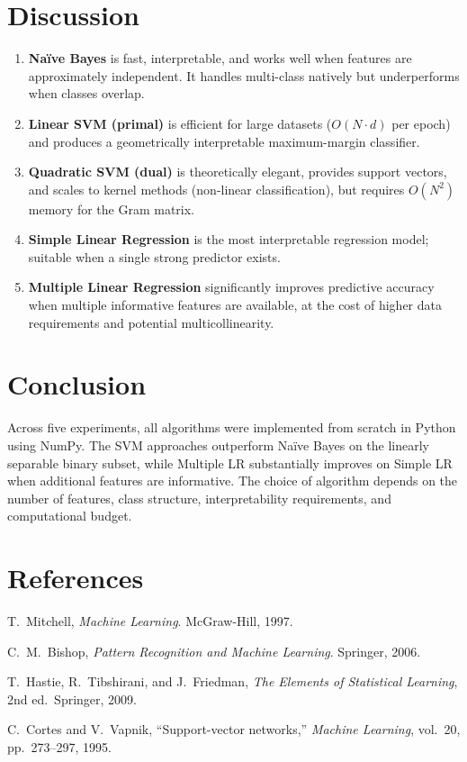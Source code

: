 \documentclass[12pt,a4paper]{article}
\begin{document}
\section{Discussion}

\begin{enumerate}[label=\arabic*.]
  \item \textbf{Naïve Bayes} is fast, interpretable, and works well when features are approximately independent. It handles multi-class natively but underperforms when classes overlap.

  \item \textbf{Linear SVM (primal)} is efficient for large datasets ($O(N \cdot d)$ per epoch) and produces a geometrically interpretable maximum-margin classifier.

  \item \textbf{Quadratic SVM (dual)} is theoretically elegant, provides support vectors, and scales to kernel methods (non-linear classification), but requires $O(N^2)$ memory for the Gram matrix.

  \item \textbf{Simple Linear Regression} is the most interpretable regression model; suitable when a single strong predictor exists.

  \item \textbf{Multiple Linear Regression} significantly improves predictive accuracy when multiple informative features are available, at the cost of higher data requirements and potential multicollinearity.
\end{enumerate}

\section{Conclusion}

Across five experiments, all algorithms were implemented from scratch in Python using NumPy. The SVM approaches outperform Naïve Bayes on the linearly separable binary subset, while Multiple LR substantially improves on Simple LR when additional features are informative. The choice of algorithm depends on the number of features, class structure, interpretability requirements, and computational budget.

\section{References}
\begin{enumerate}[label={[\arabic*]}]
  \item T.\ Mitchell, \textit{Machine Learning}. McGraw-Hill, 1997.
  \item C.\ M.\ Bishop, \textit{Pattern Recognition and Machine Learning}. Springer, 2006.
  \item T.\ Hastie, R.\ Tibshirani, and J.\ Friedman, \textit{The Elements of Statistical Learning}, 2nd ed.\ Springer, 2009.
  \item C.\ Cortes and V.\ Vapnik, ``Support-vector networks,'' \textit{Machine Learning}, vol.\ 20, pp.\ 273--297, 1995.
\end{enumerate}
\end{document}
